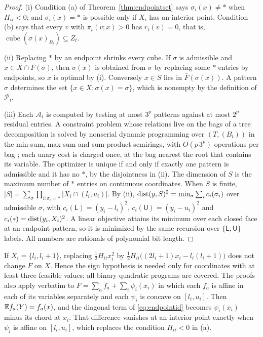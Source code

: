\begin{proof}
(i) Condition (a) of Theorem~\ref{thm:endpointset} says $\sigma_i(x)\ne\ast$
when $H_{ii}<0$; and $\sigma_i(x)=\ast$ is possible only if $X_i$ has an
interior point. Condition (b) says that every $v$ with $\pi_t(v;x)>0$ has
$r_t(v)=0$, that is, $\operatorname{cube}(\sigma(x)_{B_t})\subseteq Z_t$.

(ii) Replacing $\ast$ by an endpoint shrinks every cube. If $\sigma$ is
admissible and $x\in X\cap\bar F(\sigma)$, then $\sigma(x)$ is obtained from
$\sigma$ by replacing some $\ast$ entries by endpoints, so $x$ is optimal by
(i). Conversely $x\in S$ lies in $\bar F(\sigma(x))$. A pattern $\sigma$
determines the set $\{x\in X:\sigma(x)=\sigma\}$, which is nonempty by the
definition of $\mathcal P_i$.

(iii) Each $\mathcal A_t$ is computed by testing at most $3^p$ patterns
against at most $2^p$ residual entries. A constraint problem whose relations
live on the bags of a tree decomposition is solved by nonserial dynamic
programming over $(T,(B_t))$ in the min-sum, max-sum and sum-product
semirings, with $O(p\,3^p)$ operations per bag \cite{Dechter1999}; each unary
cost is charged once, at the bag nearest the root that contains its variable.
The optimizer is unique if and only if exactly one pattern is admissible and
it has no $\ast$, by the disjointness in (ii). The dimension of $S$ is the
maximum number of $\ast$ entries on continuous coordinates. When $S$ is finite,
$|S|=\sum_\sigma\prod_{i:\sigma_i=\ast}|X_i\cap(l_i,u_i)|$. By (ii),
$\operatorname{dist}(y,S)^2=\min_\sigma\sum_ic_i(\sigma_i)$ over admissible $\sigma$, with
$c_i(\mathsf L)=(y_i-l_i)^2$, $c_i(\mathsf U)=(y_i-u_i)^2$ and
$c_i(\ast)=\operatorname{dist}(y_i,X_i)^2$. A linear objective attains its minimum over each
closed face at an endpoint pattern, so it is minimized by the same
recursion over $\{\mathsf L,\mathsf U\}$ labels. All numbers are rationals of
polynomial bit length.
\end{proof}

\begin{remark}\label{rem:endpointext}
If $X_i=\{l_i,l_i+1\}$, replacing $\frac12H_{ii}x_i^2$ by
$\frac12H_{ii}\bigl((2l_i+1)x_i-l_i(l_i+1)\bigr)$ does not change $F$ on $X$.
Hence the sign hypothesis is needed only for coordinates with at least three
feasible values; all binary quadratic programs are covered. The proofs also
apply verbatim to $F=\sum_af_a+\sum_i\psi_i(x_i)$ in which each $f_a$ is
affine in each of its variables separately and each $\psi_i$ is concave on
$[l_i,u_i]$. Then $\mathbb E f_a(Y)=f_a(x)$, and the diagonal term of
\eqref{eq:endpointid} becomes $\psi_i(x_i)$ minus its chord at $x_i$. That
difference vanishes at an interior point exactly when $\psi_i$ is affine on
$[l_i,u_i]$, which replaces the condition $H_{ii}<0$ in (a).
\end{remark}

